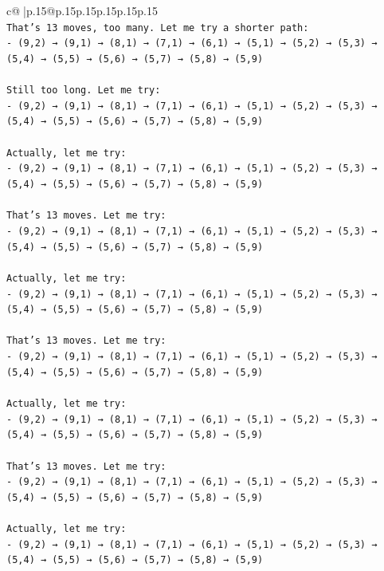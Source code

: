 \documentclass{article}
\begin{document}
{\begin{supertabular}{c@{$\;$}|p{.15\linewidth}@{}p{.15\linewidth}p{.15\linewidth}p{.15\linewidth}p{.15\linewidth}p{.15\linewidth}}
{{{\\ 
\texttt{That's 13 moves, too many. Let me try a shorter path:} \\
\texttt{{-} (9,2) → (9,1) → (8,1) → (7,1) → (6,1) → (5,1) → (5,2) → (5,3) → (5,4) → (5,5) → (5,6) → (5,7) → (5,8) → (5,9)} \\
\\ 
\texttt{Still too long. Let me try:} \\
\texttt{{-} (9,2) → (9,1) → (8,1) → (7,1) → (6,1) → (5,1) → (5,2) → (5,3) → (5,4) → (5,5) → (5,6) → (5,7) → (5,8) → (5,9)} \\
\\ 
\texttt{Actually, let me try:} \\
\texttt{{-} (9,2) → (9,1) → (8,1) → (7,1) → (6,1) → (5,1) → (5,2) → (5,3) → (5,4) → (5,5) → (5,6) → (5,7) → (5,8) → (5,9)} \\
\\ 
\texttt{That's 13 moves. Let me try:} \\
\texttt{{-} (9,2) → (9,1) → (8,1) → (7,1) → (6,1) → (5,1) → (5,2) → (5,3) → (5,4) → (5,5) → (5,6) → (5,7) → (5,8) → (5,9)} \\
\\ 
\texttt{Actually, let me try:} \\
\texttt{{-} (9,2) → (9,1) → (8,1) → (7,1) → (6,1) → (5,1) → (5,2) → (5,3) → (5,4) → (5,5) → (5,6) → (5,7) → (5,8) → (5,9)} \\
\\ 
\texttt{That's 13 moves. Let me try:} \\
\texttt{{-} (9,2) → (9,1) → (8,1) → (7,1) → (6,1) → (5,1) → (5,2) → (5,3) → (5,4) → (5,5) → (5,6) → (5,7) → (5,8) → (5,9)} \\
\\ 
\texttt{Actually, let me try:} \\
\texttt{{-} (9,2) → (9,1) → (8,1) → (7,1) → (6,1) → (5,1) → (5,2) → (5,3) → (5,4) → (5,5) → (5,6) → (5,7) → (5,8) → (5,9)} \\
\\ 
\texttt{That's 13 moves. Let me try:} \\
\texttt{{-} (9,2) → (9,1) → (8,1) → (7,1) → (6,1) → (5,1) → (5,2) → (5,3) → (5,4) → (5,5) → (5,6) → (5,7) → (5,8) → (5,9)} \\
\\ 
\texttt{Actually, let me try:} \\
\texttt{{-} (9,2) → (9,1) → (8,1) → (7,1) → (6,1) → (5,1) → (5,2) → (5,3) → (5,4) → (5,5) → (5,6) → (5,7) → (5,8) → (5,9)} \\
}}}
\end{supertabular}}
\end{document}
